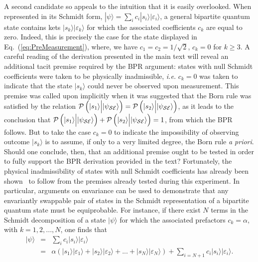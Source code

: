 \documentclass[12pt]{iopart}
\begin{document}
 A second candidate  so appeals to the intuition that it is easily overlooked. When represented in its Schmidt form, $|\psi\rangle = \sum_i c_i |s_i\rangle|\varepsilon_i\rangle$, a general bipartite quantum state contains kets $|s_k\rangle|\varepsilon_k\rangle$ for which the associated coefficients $c_k$ are equal to zero. Indeed, this is precisely the case for the state displayed in Eq.~(\ref{eq:PreMeasurement}), where, we have $c_1=c_2=1/\sqrt{2}$, $c_k=0$ for $k\geq3$. A careful reading of the derivation presented in the main text will reveal an additional tacit premise required by the BPR argument: states with null Schmidt coefficients were taken to be physically inadmissible, \textit{i.e.} $c_k=0$ was taken to indicate that the state $|s_k\rangle$ could never be observed upon measurement. This premise was called upon implicitly when it was suggested that the Born rule was satisfied by the relation ${\cal P}\left(|s_1\rangle {\Big |} |\psi_{\cal SE} \rangle \right)={\cal P}\left(|s_2\rangle {\Big |} |\psi_{\cal SE} \rangle \right)$, as it leads to the conclusion that ${\cal P}\left(|s_1\rangle {\Big |} |\psi_{\cal SE} \rangle \right)+{\cal P}\left(|s_2\rangle {\Big |} |\psi_{\cal SE} \rangle \right)=1$, from which the BPR follows. But to take the case $c_k=0$ to indicate the impossibility of observing outcome $|s_k\rangle$ is to assume, if only to a very limited degree, the Born rule \textit{a priori}. Should one conclude, then, that an additional premise ought to be tested in order to fully support the BPR derivation provided in the text?
%
\sloppy
Fortunately, the physical inadmissibility of states with null Schmidt coefficients has already been shown~\cite{zurek:08} to follow from the premises already tested during this experiment. In particular, arguments on envariance can be used to demonstrate that any envariantly swappable pair of states in the Schmidt representation of a bipartite quantum state must be equiprobable. For instance, if there exist $N$ terms in the Schmidt decomposition of a state $|\psi\rangle$ for which the associated prefactors $c_k=\alpha$, with $k=1,2,...,N$, one finds that
%
\begin{eqnarray}\label{eq:nullschmidt1}
	|\psi\rangle&=& \sum_i c_i |s_i\rangle|\varepsilon_i\rangle\\\nonumber 
	&=& \alpha\left(|s_1\rangle|\varepsilon_1\rangle + |s_2\rangle|\varepsilon_2\rangle + ... + |s_N\rangle|\varepsilon_N\rangle \right)+ \sum_{i=N+1}c_i |s_i\rangle|\varepsilon_i\rangle.
\end{eqnarray}
%
\end{document}
